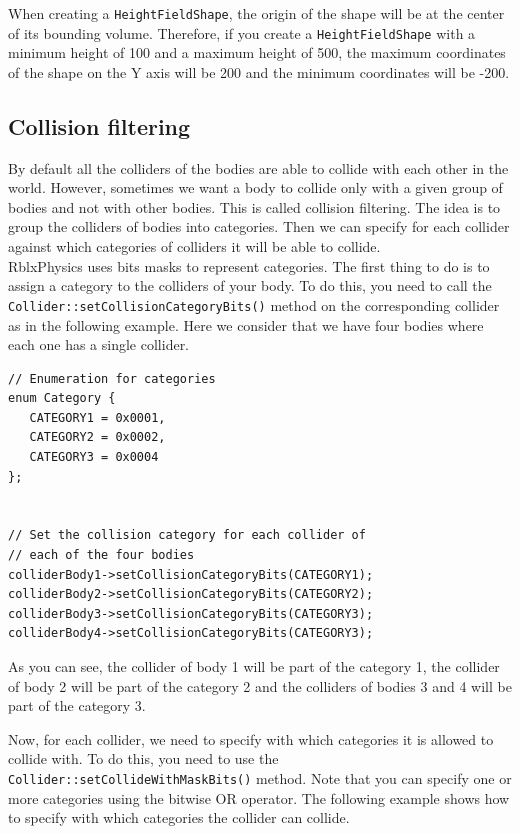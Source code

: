\documentclass[a4paper,12pt]{article}
\begin{document}
  When creating a \texttt{HeightFieldShape}, the origin of the shape will be at the center of its bounding volume.
  Therefore, if you create a \texttt{HeightFieldShape} with a minimum height of 100 and a maximum height of 500, the
  maximum coordinates of the shape on the Y axis will be 200 and the minimum coordinates will be -200.

    \subsection{Collision filtering}
    \label{sec:collisionfiltering}

    By default all the colliders of the bodies are able to collide with each other in the world. However, sometimes we want a body to collide only
    with a given group of bodies and not with other bodies. This is called collision filtering. The idea is to group the colliders of bodies into
    categories. Then we can specify for each collider against which categories of colliders it will be able to collide. \\

    RblxPhysics uses bits masks to represent categories. The first thing to do is to assign a category to the colliders of your body. To do
    this, you need to call the \texttt{Collider::setCollisionCategoryBits()} method on the corresponding collider as in the following example. Here
    we consider that we have four bodies where each one has a single collider. \\

    \begin{lstlisting}
// Enumeration for categories
enum Category {
   CATEGORY1 = 0x0001,
   CATEGORY2 = 0x0002,
   CATEGORY3 = 0x0004
};


// Set the collision category for each collider of
// each of the four bodies
colliderBody1->setCollisionCategoryBits(CATEGORY1);
colliderBody2->setCollisionCategoryBits(CATEGORY2);
colliderBody3->setCollisionCategoryBits(CATEGORY3);
colliderBody4->setCollisionCategoryBits(CATEGORY3);
  \end{lstlisting}

    \vspace{0.6cm}

    As you can see, the collider of body 1 will be part of the category 1, the collider of body 2 will be part of the category 2 and the colliders of
    bodies 3 and 4 will be part of the category 3. \\

    \begin{sloppypar}
    Now, for each collider, we need to specify with which categories it is allowed to collide with. To do this, you need to use the 
    \texttt{Collider::setCollideWithMaskBits()} method. Note that you can specify one or more categories using the bitwise OR operator. The
    following example shows how to specify with which categories the collider can collide. \\
    \end{sloppypar}
\end{document}

